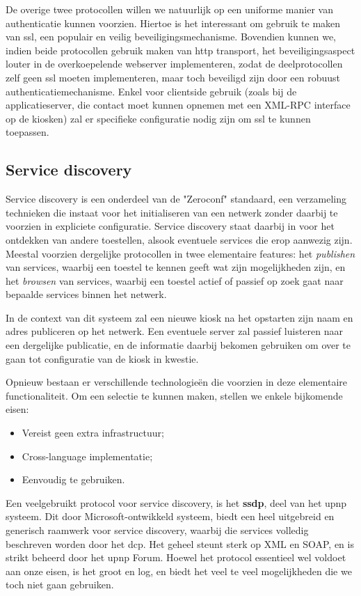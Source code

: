 De overige twee protocollen willen we natuurlijk op een uniforme manier van authenticatie kunnen voorzien. Hiertoe is het interessant om gebruik te maken van \ac{ssl}, een populair en veilig beveiligingsmechanisme. Bovendien kunnen we, indien beide protocollen gebruik maken van \ac{http} transport, het beveiligingsaspect louter in de overkoepelende webserver implementeren, zodat de deelprotocollen zelf geen \ac{ssl} moeten implementeren, maar toch beveiligd zijn door een robuust authenticatiemechanisme. Enkel voor clientside gebruik (zoals bij de applicatieserver, die contact moet kunnen opnemen met een XML-RPC interface op de kiosken) zal er specifieke configuratie nodig zijn om \ac{ssl} te kunnen toepassen.

\subsection{Service discovery}

Service discovery is een onderdeel van de "Zeroconf" standaard, een verzameling technieken die instaat voor het initialiseren van een netwerk zonder daarbij te voorzien in expliciete configuratie. Service discovery staat daarbij in voor het ontdekken van andere toestellen, alsook eventuele services die erop aanwezig zijn. Meestal voorzien dergelijke protocollen in twee elementaire features: het \emph{publishen} van services, waarbij een toestel te kennen geeft wat zijn mogelijkheden zijn, en het \emph{browsen} van services, waarbij een toestel actief of passief op zoek gaat naar bepaalde services binnen het netwerk.

In de context van dit systeem zal een nieuwe kiosk na het opstarten zijn naam en adres publiceren op het netwerk. Een eventuele server zal passief luisteren naar een dergelijke publicatie, en de informatie daarbij bekomen gebruiken om over te gaan tot configuratie van de kiosk in kwestie.

Opnieuw bestaan er verschillende technologieën die voorzien in deze elementaire functionaliteit. Om een selectie te kunnen maken, stellen we enkele bijkomende eisen: 
\begin{itemize}
\item Vereist geen extra infrastructuur;
\item Cross-language implementatie;
\item Eenvoudig te gebruiken.
\end{itemize}

Een veelgebruikt protocol voor service discovery, is het  \textbf{\ac{ssdp}}, deel van het \ac{upnp} systeem. Dit door Microsoft-ontwikkeld systeem, biedt een heel uitgebreid en generisch raamwerk voor service discovery, waarbij die services volledig beschreven worden door het \ac{dcp}. Het geheel steunt sterk op XML en SOAP, en is strikt beheerd door het \ac{upnp} Forum. Hoewel het protocol essentieel wel voldoet aan onze eisen, is het groot en log, en biedt het veel te veel mogelijkheden die we toch niet gaan gebruiken.

